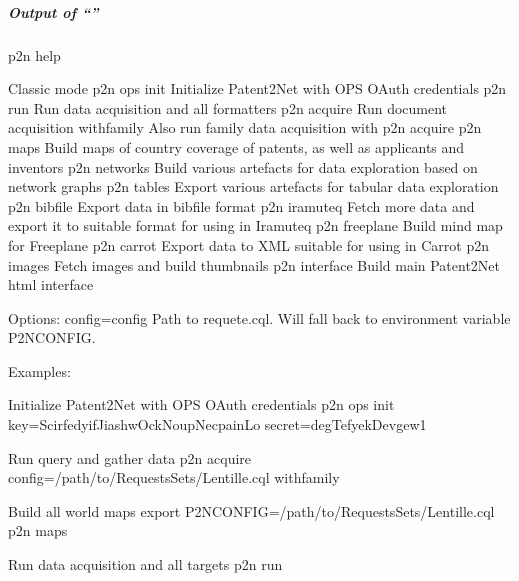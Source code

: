 \documentclass[letterpaper,10pt,english]{sphinxmanual}
\begin{document}
\subparagraph{Output of “”}
\label{\detokenize{usage/classic:output-of-p2n-help}}
\begin{sphinxVerbatim}[commandchars=\\\{\}]
\PYGZdl{} p2n \PYGZhy{}\PYGZhy{}help

\PYGZhy{}\PYGZhy{}\PYGZhy{}\PYGZhy{}\PYGZhy{}\PYGZhy{}\PYGZhy{}\PYGZhy{}\PYGZhy{}\PYGZhy{}\PYGZhy{}\PYGZhy{}
Classic mode
\PYGZhy{}\PYGZhy{}\PYGZhy{}\PYGZhy{}\PYGZhy{}\PYGZhy{}\PYGZhy{}\PYGZhy{}\PYGZhy{}\PYGZhy{}\PYGZhy{}\PYGZhy{}
  p2n ops init                          Initialize Patent2Net with OPS OAuth credentials
  p2n run                               Run data acquisition and all formatters
  p2n acquire                           Run document acquisition
    \PYGZhy{}\PYGZhy{}with\PYGZhy{}family                       Also run family data acquisition with \PYGZdq{}p2n acquire\PYGZdq{}
  p2n maps                              Build maps of country coverage of patents, as well as applicants and inventors
  p2n networks                          Build various artefacts for data exploration based on network graphs
  p2n tables                            Export various artefacts for tabular data exploration
  p2n bibfile                           Export data in bibfile format
  p2n iramuteq                          Fetch more data and export it to suitable format for using in Iramuteq
  p2n freeplane                         Build mind map for Freeplane
  p2n carrot                            Export data to XML suitable for using in Carrot
  p2n images                            Fetch images and build thumbnails
  p2n interface                         Build main Patent2Net html interface

Options:
  \PYGZhy{}\PYGZhy{}config=\PYGZlt{}config\PYGZgt{}                     Path to requete.cql. Will fall back to environment variable \PYGZdq{}P2N\PYGZus{}CONFIG\PYGZdq{}.

Examples:

  \PYGZsh{} Initialize Patent2Net with OPS OAuth credentials
  p2n ops init \PYGZhy{}\PYGZhy{}key=ScirfedyifJiashwOckNoupNecpainLo \PYGZhy{}\PYGZhy{}secret=degTefyekDevgew1

  \PYGZsh{} Run query and gather data
  p2n acquire \PYGZhy{}\PYGZhy{}config=/path/to/RequestsSets/Lentille.cql \PYGZhy{}\PYGZhy{}with\PYGZhy{}family

  \PYGZsh{} Build all world maps
  export P2N\PYGZus{}CONFIG=/path/to/RequestsSets/Lentille.cql
  p2n maps

  \PYGZsh{} Run data acquisition and all targets
  p2n run
\end{sphinxVerbatim}
\end{document}
